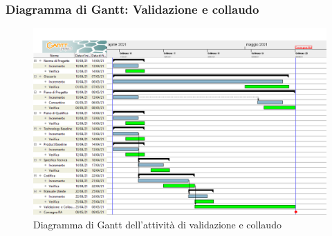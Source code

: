 \subsubsection{Diagramma di Gantt: Validazione e collaudo}
\begin{figure}[ht]
    \centering
    \includegraphics[width=\textwidth]{Immagini/GanttValidazioneECollaudo}
    \caption{Diagramma di Gantt dell'attività di validazione e collaudo}
\end{figure}